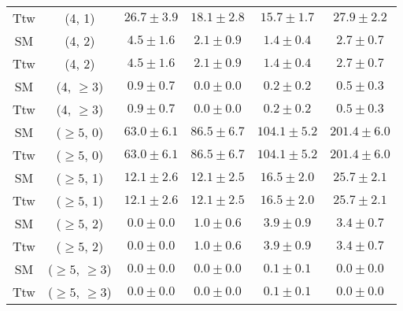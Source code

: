 \begin{table}[h!]
{\begin{tabular}{cccccc}
	Ttw & (4, 1) & $26.7\pm 3.9$ & $18.1\pm 2.8$ & $15.7\pm 1.7$ & $27.9\pm 2.2$ \\[0.5ex] 
	SM & (4, 2) & $4.5\pm 1.6$ & $2.1\pm 0.9$ & $1.4\pm 0.4$ & $2.7\pm 0.7$ \\[0.5ex] 
	Ttw & (4, 2) & $4.5\pm 1.6$ & $2.1\pm 0.9$ & $1.4\pm 0.4$ & $2.7\pm 0.7$ \\[0.5ex] 
	SM & (4, $\ge3$) & $0.9\pm 0.7$ & $0.0\pm 0.0$ & $0.2\pm 0.2$ & $0.5\pm 0.3$ \\[0.5ex] 
	Ttw & (4, $\ge3$) & $0.9\pm 0.7$ & $0.0\pm 0.0$ & $0.2\pm 0.2$ & $0.5\pm 0.3$ \\[0.5ex] 
	SM & ($\ge5$, 0) & $63.0\pm 6.1$ & $86.5\pm 6.7$ & $104.1\pm 5.2$ & $201.4\pm 6.0$ \\[0.5ex] 
	Ttw & ($\ge5$, 0) & $63.0\pm 6.1$ & $86.5\pm 6.7$ & $104.1\pm 5.2$ & $201.4\pm 6.0$ \\[0.5ex] 
	SM & ($\ge5$, 1) & $12.1\pm 2.6$ & $12.1\pm 2.5$ & $16.5\pm 2.0$ & $25.7\pm 2.1$ \\[0.5ex] 
	Ttw & ($\ge5$, 1) & $12.1\pm 2.6$ & $12.1\pm 2.5$ & $16.5\pm 2.0$ & $25.7\pm 2.1$ \\[0.5ex] 
	SM & ($\ge5$, 2) & $0.0\pm 0.0$ & $1.0\pm 0.6$ & $3.9\pm 0.9$ & $3.4\pm 0.7$ \\[0.5ex] 
	Ttw & ($\ge5$, 2) & $0.0\pm 0.0$ & $1.0\pm 0.6$ & $3.9\pm 0.9$ & $3.4\pm 0.7$ \\[0.5ex] 
	SM & ($\ge5$, $\ge3$) & $0.0\pm 0.0$ & $0.0\pm 0.0$ & $0.1\pm 0.1$ & $0.0\pm 0.0$ \\[0.5ex] 
	Ttw & ($\ge5$, $\ge3$) & $0.0\pm 0.0$ & $0.0\pm 0.0$ & $0.1\pm 0.1$ & $0.0\pm 0.0$ \\[0.5ex] 
	\hline
	\hline
\end{tabular}}
\end{table}
